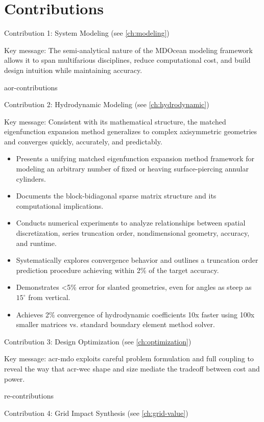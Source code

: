 \section{Contributions}
Contribution 1: System Modeling (see \cref{ch:modeling})

Key message: The semi-analytical nature of the MDOcean modeling framework allows it to span multifarious disciplines, reduce computational cost, and build design intuition while maintaining accuracy.
\begin{itemize}
{aor-contributions}
\end{itemize}
%
\noindent
Contribution 2: Hydrodynamic Modeling (see \cref{ch:hydrodynamic})

Key message: Consistent with its mathematical structure, the matched eigenfunction expansion method generalizes to complex axisymmetric geometries and converges quickly, accurately, and predictably.

\begin{itemize}
\item Presents a unifying matched eigenfunction expansion method framework for modeling an arbitrary number of fixed or heaving surface-piercing annular cylinders.
\item Documents the block-bidiagonal sparse matrix structure and its computational implications.
\item Conducts numerical experiments to analyze relationships between spatial discretization, series truncation order, nondimensional geometry, accuracy, and runtime.
\item Systematically explores convergence behavior and outlines a truncation order prediction procedure achieving within 2\% of the target accuracy.
\item Demonstrates <5\% error for slanted geometries, even for angles as steep as $15^\circ$ from vertical.
\item Achieves 2\% convergence of hydrodynamic coefficients 10x faster using 100x smaller matrices vs. standard boundary element method solver.
\end{itemize}
%
\noindent
Contribution 3: Design Optimization (see \cref{ch:optimization})

Key message: \gls{acr-mdo} exploits careful problem formulation and full coupling to reveal the way that \gls{acr-wec} shape and size mediate the tradeoff between cost and power.
\begin{itemize}
{re-contributions}
\end{itemize}
%
\ifdefined\DECIDER
  \noindent 
  Contribution 4: Grid Impact Synthesis (see \cref{ch:grid-value})

